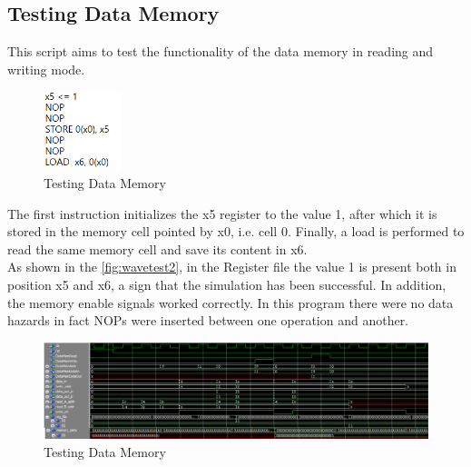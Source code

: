 \subsection{Testing Data Memory}
This script aims to test the functionality of the data memory in reading and writing mode.
\begin{figure}[H]
	\centering
	\includegraphics[width=0.2\textwidth]{sec3/images/test2.png}
	\caption{Testing Data Memory}
	\label{fig:test2}
\end{figure}
\noindent The first instruction initializes the x5 register to the value 1, after which it is stored in the memory cell pointed by x0, i.e. cell 0. Finally, a load is performed to read the same memory cell and save its content in x6.\\
As shown in the \autoref{fig:wavetest2}, in the Register file the value 1 is present both in position x5 and x6, a sign that the simulation has been successful. In addition, the memory enable signals worked correctly. In this program there were no data hazards in fact NOPs were inserted between one operation and another.
\begin{figure}[H]
	\centering
	\includegraphics[width=1\textwidth]{sec3/images/wave_test2.png}
	\caption{Testing Data Memory}
	\label{fig:wavetest2}
\end{figure}

